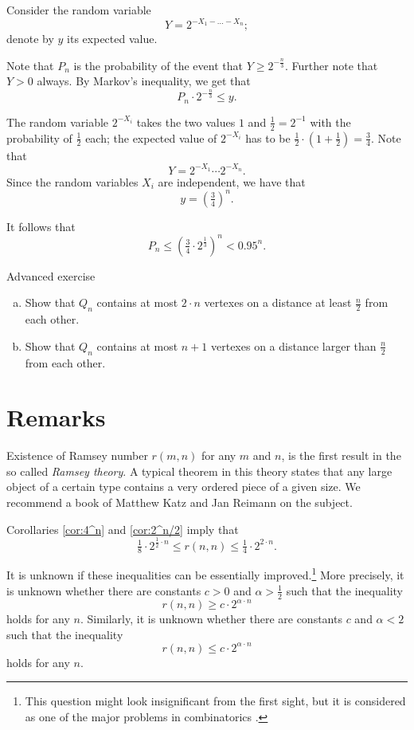Consider the random variable 
\[Y=2^{-X_1-\dots-X_n};\]
denote by $y$ its expected value.

Note that $P_n$ is the probability of the event that $Y\ge 2^{-\frac n3}$.
Further note that $Y>0$ always. 
By Markov's inequality, we get that
\[P_n\cdot 2^{-\frac n3}\le y.\]

The random variable $2^{-X_i}$ takes the two values $1$ and $\tfrac12=2^{-1}$ with the probability of $\tfrac12$ each;
the expected value of $2^{-X_i}$ has to be $\tfrac12\cdot (1+\tfrac12)=\tfrac 34$.
Note that 
\[Y=2^{-X_1}\cdots 2^{-X_n}.\]
Since the random variables $X_i$ are independent, we have that
\[y=\left(\tfrac34\right)^n.\]

It follows that 
\[P_n\le \left(\tfrac34\cdot 2^{\frac13}\right)^n< 0.95^n.\]
\qedsf

\pagebreak[1]
\begin{thm}{Advanced exercise}\label{ex:lin-Qn}
\begin{enumerate}[(a)]
\item Show that $Q_n$ contains at most $2\cdot n$ vertexes on a distance at least $\tfrac n2$ from each other. 
\item Show that $Q_n$ contains at most $n+1$ vertexes on a distance larger than $\tfrac n2$ from each other. 
\end{enumerate}
\end{thm}
 

\section*{Remarks}

Existence of Ramsey number $r(m,n)$ for any $m$ and $n$, is the first result in the so called \emph{Ramsey theory}. 
A typical theorem in this theory states that any large object of a certain type contains a very ordered piece of a given size.
We recommend a book of Matthew Katz and Jan Reimann \cite{katz-reimann} on the subject. 

Corollaries \ref{cor:4^n} and \ref{cor:2^n/2} imply that 
\[\tfrac18\cdot 2^{\frac12\cdot n}\le r(n,n)\le \tfrac14\cdot 2^{2\cdot n}.\]

It is unknown if these inequalities can be essentially improved.\footnote{This question might look insignificant from the first sight, but it is considered as one of the major problems in combinatorics \cite{gowers}.}
More precisely, it is unknown whether there are constants $c>0$ and $\alpha>\tfrac12$ such that the inequality
\[r(n,n)\ge c\cdot 2^{\alpha\cdot n}\]
holds for any $n$.
Similarly, it is unknown whether there are constants $c$ and $\alpha<2$ such that the inequality
\[r(n,n)\le c\cdot 2^{\alpha\cdot n}\]
holds for any $n$.

